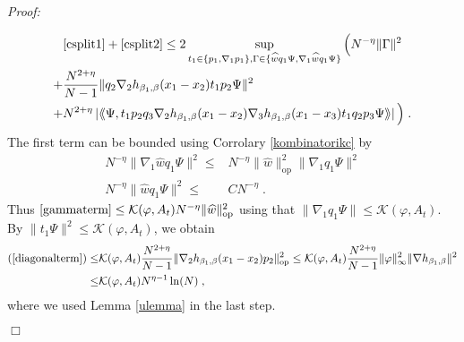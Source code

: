 \documentclass[11pt, english, american]{article}
\newcommand{\laa}{\langle\hspace{-0.08cm}\langle}
\newcommand{\raa}{\rangle\hspace{-0.08cm}\rangle}
\newenvironment{proof}{\emph{Proof:}}{\begin{flushright} $ \Box $ \end{flushright}}
\renewcommand{\phi}{\varphi}
\begin{document}
\begin{proof}
\begin{enumerate}
\begin{align}
\label{gammaterm}
&\eqref{csplit1}+\eqref{csplit2}
\leq 
2 
\sup_{t_1 \in  \lbrace p_1, \nabla_1 p_1 \rbrace,  \Gamma \in \lbrace \widehat{w}q_1\Psi, \nabla_1 \widehat{w}q_1\Psi \rbrace }
\Big(
N^{-\eta} \| \Gamma \|^2
\\
\label{diagonalterm}
+&
\frac{N^{2+\eta}}{N-1}\|q_2\nabla_2 h_{\beta_1,\beta}(x_1-x_2)t_1p_2\Psi\|^2
 \\
\label{nebendiagonale}
+&
N^{2+\eta}\left|\laa \Psi,t_1p_2 q_3 \nabla_2 h_{\beta_1,\beta}(x_1-x_2)\nabla_3 h_{\beta_1,\beta}
(x_1-x_3)t_1q_2 p_3\Psi\raa\right|
\Big)
\;.
 \end{align}
The first term can be bounded using Corrolary \ref{kombinatorikc} by
\begin{align*}
N^{-\eta}\|\nabla_1 \widehat{w}q_1\Psi\|^2
\leq &
N^{-\eta} \| \widehat{w} \|^2_{\text{op}} \|\nabla_1 q_1 \Psi\|^2
\\
N^{-\eta}\| \widehat{w}q_1\Psi\|^2
\leq&
C N^{-\eta}
\;.
\end{align*}
Thus $\eqref{gammaterm} \leq \mathcal{K}(\phi, A_t)
N^{-\eta} \| \widehat{w} \|^2_{\text{op}} $ using that $\|\nabla_1 q_1 \Psi\| \leq \mathcal{K}(\phi, A_t)$.
By $\|t_1\Psi\|^2 \leq \mathcal{K}(\phi, A_t)$, we obtain
\begin{align*}
 (\ref{diagonalterm})
 \leq&
 \mathcal{K}(\phi, A_t)
 \frac{N^{2+\eta}}{N-1}\|\nabla_2 h_{\beta_1,\beta}(x_1-x_2)p_2\|_{\text{op}}^2
\leq 
 \mathcal{K}(\phi, A_t)
\frac{N^{2+\eta}}{N-1}
\|\phi\|_\infty ^2
\|\nabla h_{\beta_1,\beta}\|^2
\\
\leq&
 \mathcal{K}(\phi, A_t)
N^{\eta-1}\ln(N)
 \;,
 \end{align*}
where we used Lemma \ref{ulemma} in the last step.


\end{enumerate}
\end{proof}
\end{document}
